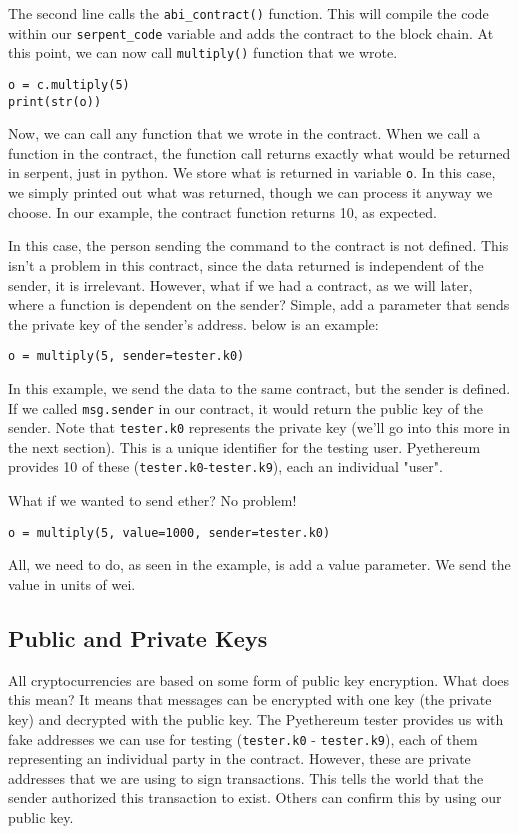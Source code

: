 \documentclass[12pt]{article}
\begin{document}
The second line calls the \texttt{abi\_contract()} function. This will compile the code within our \texttt{serpent\_code} variable and adds the contract to the block chain. At this point, we can now call \texttt{multiply()} function that we wrote. 

\begin{verbatim}
o = c.multiply(5)
print(str(o))
\end{verbatim}

Now, we can call any function that we wrote in the contract. When we call a function in the contract, the function call returns exactly what would be returned in serpent, just in python. We store what is returned in variable \texttt{o}. In this case, we simply printed out what was returned, though we can process it anyway we choose. In our example, the contract function returns 10, as expected.

In this case, the person sending the command to the contract is not defined. This isn't a problem in this contract, since the data returned is independent of the sender, it is irrelevant. However, what if we had a contract, as we will later, where a function is dependent on the sender? Simple, add a parameter that sends the private key of the sender's address. below is an example:

\begin{verbatim}
o = multiply(5, sender=tester.k0)
\end{verbatim}

In this example, we send the data to the same contract, but the sender is defined. If we called \texttt{msg.sender} in our contract, it would return the public key of the sender. Note that \texttt{tester.k0} represents the private key (we'll go into this more in the next section). This is a unique identifier for the testing user. Pyethereum provides 10 of these (\texttt{tester.k0}-\texttt{tester.k9}), each an individual "user".

What if we wanted to send ether? No problem! 
\begin{verbatim}
o = multiply(5, value=1000, sender=tester.k0)
\end{verbatim}

All, we need to do, as seen in the example, is add a value parameter. We send the value in units of wei.

\cite{test_contracts.py,Usingpyethereum.tester}

\subsection{Public and Private Keys}
All cryptocurrencies are based on some form of public key encryption. What does this mean? It means that messages can be encrypted with one key (the private key) and decrypted with the public key. The Pyethereum tester provides us with fake addresses we can use for testing (\texttt{tester.k0} - \texttt{tester.k9}), each of them representing an individual party in the contract. However, these are private addresses that we are using to sign transactions. This tells the world that the sender authorized this transaction to exist. Others can confirm this by using our public key. 
\end{document}
